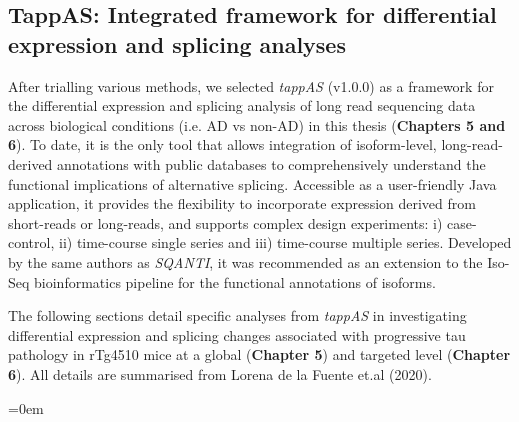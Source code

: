 \subsection{TappAS: Integrated framework for differential expression and splicing analyses}\label{ch3_tappas_explained}
After trialling various methods, we selected \textit{tappAS}\cite{DeLaFuente2020} (v1.0.0) as a framework for the differential expression and splicing analysis of long read sequencing data across biological conditions (i.e. AD vs non-AD) in this thesis (\textbf{Chapters 5 and 6}). To date, it is the only tool that allows integration of isoform-level, long-read-derived annotations with public databases to comprehensively understand the functional implications of alternative splicing. Accessible as a user-friendly Java application, it provides the flexibility to incorporate expression derived from short-reads or long-reads, and supports complex design experiments: i) case-control, ii) time-course single series and iii) time-course multiple series. Developed by the same authors as \textit{SQANTI}\cite{Tardaguila2018}, it was recommended as an extension to the Iso-Seq bioinformatics pipeline for the functional annotations of isoforms.    

The following sections detail specific analyses from \textit{tappAS} in investigating differential expression and splicing changes associated with progressive tau pathology in rTg4510 mice at a global (\textbf{Chapter 5}) and targeted level (\textbf{Chapter 6}). All details are summarised from Lorena de la Fuente et.al (2020)\cite{DeLaFuente2020}.

\vspace{2cm}
\begingroup
\parindent=0em
\localtableofcontents 
\endgroup


